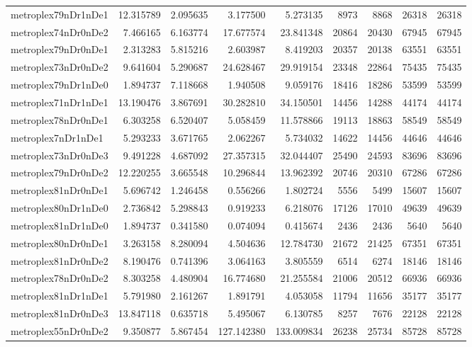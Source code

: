 \begin{longtable}{|l|r|r|r|r|r|r|r|r|}
metroplex79nDr1nDe1 & 12.315789 & 2.095635 & 3.177500 & 5.273135 & 8973 & 8868 & 26318 & 26318 \\
metroplex74nDr0nDe2 & 7.466165 & 6.163774 & 17.677574 & 23.841348 & 20864 & 20430 & 67945 & 67945 \\
metroplex79nDr0nDe1 & 2.313283 & 5.815216 & 2.603987 & 8.419203 & 20357 & 20138 & 63551 & 63551 \\
metroplex73nDr0nDe2 & 9.641604 & 5.290687 & 24.628467 & 29.919154 & 23348 & 22864 & 75435 & 75435 \\
metroplex79nDr1nDe0 & 1.894737 & 7.118668 & 1.940508 & 9.059176 & 18416 & 18286 & 53599 & 53599 \\
metroplex71nDr1nDe1 & 13.190476 & 3.867691 & 30.282810 & 34.150501 & 14456 & 14288 & 44174 & 44174 \\
metroplex78nDr0nDe1 & 6.303258 & 6.520407 & 5.058459 & 11.578866 & 19113 & 18863 & 58549 & 58549 \\
metroplex7nDr1nDe1 & 5.293233 & 3.671765 & 2.062267 & 5.734032 & 14622 & 14456 & 44646 & 44646 \\
metroplex73nDr0nDe3 & 9.491228 & 4.687092 & 27.357315 & 32.044407 & 25490 & 24593 & 83696 & 83696 \\
metroplex79nDr0nDe2 & 12.220255 & 3.665548 & 10.296844 & 13.962392 & 20746 & 20310 & 67286 & 67286 \\
metroplex81nDr0nDe1 & 5.696742 & 1.246458 & 0.556266 & 1.802724 & 5556 & 5499 & 15607 & 15607 \\
metroplex80nDr1nDe0 & 2.736842 & 5.298843 & 0.919233 & 6.218076 & 17126 & 17010 & 49639 & 49639 \\
metroplex81nDr1nDe0 & 1.894737 & 0.341580 & 0.074094 & 0.415674 & 2436 & 2436 & 5640 & 5640 \\
metroplex80nDr0nDe1 & 3.263158 & 8.280094 & 4.504636 & 12.784730 & 21672 & 21425 & 67351 & 67351 \\
metroplex81nDr0nDe2 & 8.190476 & 0.741396 & 3.064163 & 3.805559 & 6514 & 6274 & 18146 & 18146 \\
metroplex78nDr0nDe2 & 8.303258 & 4.480904 & 16.774680 & 21.255584 & 21006 & 20512 & 66936 & 66936 \\
metroplex81nDr1nDe1 & 5.791980 & 2.161267 & 1.891791 & 4.053058 & 11794 & 11656 & 35177 & 35177 \\
metroplex81nDr0nDe3 & 13.847118 & 0.635718 & 5.495067 & 6.130785 & 8257 & 7676 & 22128 & 22128 \\
metroplex55nDr0nDe2 & 9.350877 & 5.867454 & 127.142380 & 133.009834 & 26238 & 25734 & 85728 & 85728 \\

\end{longtable}
